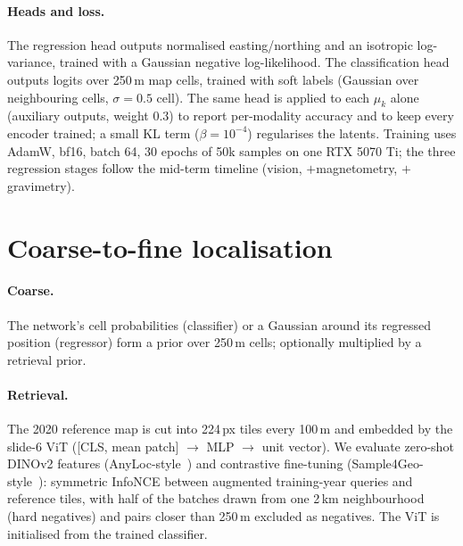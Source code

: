 \documentclass[11pt,a4paper]{article}
\begin{document}
\paragraph{Heads and loss.} The regression head outputs normalised easting/northing and an isotropic
log-variance, trained with a Gaussian negative log-likelihood. The classification head outputs logits
over 250\,m map cells, trained with soft labels (Gaussian over neighbouring cells, $\sigma=0.5$ cell).
The same head is applied to each $\mu_k$ alone (auxiliary outputs, weight 0.3) to report per-modality
accuracy and to keep every encoder trained; a small KL term ($\beta=10^{-4}$) regularises the latents.
Training uses AdamW, bf16, batch 64, 30 epochs of 50k samples on one RTX 5070 Ti; the three
regression stages follow the mid-term timeline (vision, $+$magnetometry, $+$gravimetry).

\section{Coarse-to-fine localisation}\label{sec:c2f}
\paragraph{Coarse.} The network's cell probabilities (classifier) or a Gaussian around its regressed
position (regressor) form a prior over 250\,m cells; optionally multiplied by a retrieval prior.

\paragraph{Retrieval.} The 2020 reference map is cut into 224\,px tiles every 100\,m and embedded by
the slide-6 ViT ([CLS, mean patch] $\to$ MLP $\to$ unit vector). We evaluate zero-shot DINOv2 features
(AnyLoc-style~\cite{keetha2023anyloc}) and contrastive fine-tuning (Sample4Geo-style~\cite{deuser2023sample4geo}):
symmetric InfoNCE between augmented training-year queries and reference tiles, with half of the
batches drawn from one 2\,km neighbourhood (hard negatives) and pairs closer than 250\,m excluded as
negatives. The ViT is initialised from the trained classifier.
\end{document}
